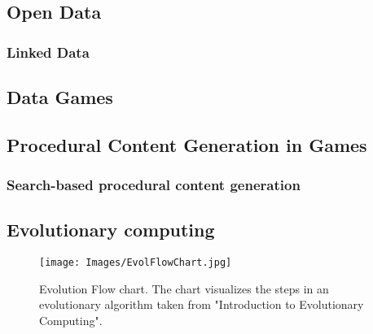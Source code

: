\documentclass[a4paper,11pt]{article}
\begin{document}
\subsection{Open Data}
\subsubsection{Linked Data}
\subsection{Data Games}
\label{datagames}

\subsection{Procedural Content Generation in Games}
\label{procgen}

\subsubsection{Search-based procedural content generation}

\subsection{Evolutionary computing}
\label{evolcomp}
\begin{figure}[h]
    \centering
    \texttt{[image: Images/EvolFlowChart.jpg]}
    \caption{Evolution Flow chart. The chart visualizes the steps in an evolutionary algorithm taken from "Introduction to Evolutionary Computing"\cite{EibenSmith2007}.}
    \label{fig:EvolFlowChart}
\end{figure}
\end{document}
